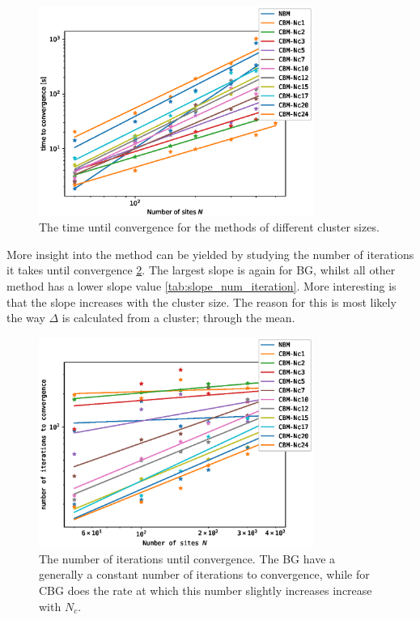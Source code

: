 \documentclass[11pt]{article}
\begin{document}
\begin{figure}[ht!]
	\centering
	\includegraphics[width=0.8\textwidth]{figures/timing_analysis_tot_time.eps}
	\caption{ The time until convergence for the methods of different cluster sizes. }
	\label{fig:solution_time}
\end{figure}

More insight into the method can be yielded by studying the number of iterations it takes until convergence \ref{fig:num_iterations}. The largest slope is again for BG, whilst all other method has a lower slope value \ref{tab:slope_num_iteration}. More interesting is that the slope increases with the cluster size. The reason for this is most likely the way $\Delta$ is calculated from a cluster; through the mean. 

\begin{figure}[ht!]
	\centering
	\includegraphics[width=0.8\textwidth]{figures/num_iterations.eps}
	\caption{ The number of iterations until convergence. The BG have a generally a constant number of iterations to convergence, while for CBG does the rate at which this number slightly increases increase with $N_c$.}
	\label{fig:num_iterations}
\end{figure}
\end{document}
